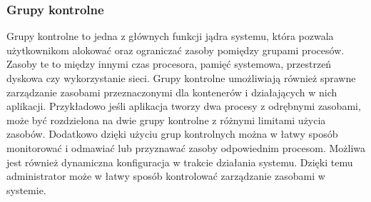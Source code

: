 \documentclass[12pt]{report}
\let\Oldsubsubsection\subsubsection
\renewcommand{\subsubsection}{\FloatBarrier\Oldsubsubsection}
\begin{document}
\subsubsection{Grupy kontrolne}
Grupy kontrolne to jedna z głównych funkcji jądra systemu, która pozwala użytkownikom alokować oraz ograniczać zasoby pomiędzy grupami procesów. Zasoby te to między innymi czas procesora, pamięć systemowa, przestrzeń dyskowa czy wykorzystanie sieci. Grupy kontrolne umożliwiają również sprawne zarządzanie zasobami przeznaczonymi dla kontenerów i działających w nich aplikacji. Przykładowo jeśli aplikacja tworzy dwa procesy z odrębnymi zasobami, może być rozdzielona na dwie grupy kontrolne z różnymi limitami użycia zasobów. Dodatkowo dzięki użyciu grup kontrolnych można w łatwy sposób monitorować i odmawiać lub przyznawać zasoby odpowiednim procesom. Możliwa jest również dynamiczna konfiguracja w trakcie działania systemu. Dzięki temu administrator może w łatwy sposób kontrolować zarządzanie zasobami w systemie. 
\end{document}
